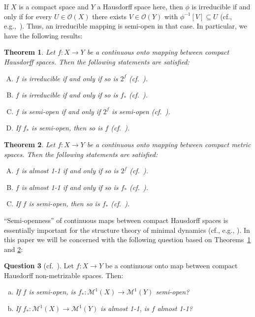 \documentclass[12pt,final,3p,times]{elsarticle}
\newtheorem{sthm}{Theorem}[subsection]
\theoremstyle{definition}
\newtheorem{sq}[sthm]{Question}
\numberwithin{equation}{section}
\begin{document}
If $X$ is a compact space and $Y$ a Hausdorff space here, then $\phi$ is irreducible if and only if 
for every $U\in\mathscr{O}(X)$ there exists $V\in\mathscr{O}(Y)$ with $\phi^{-1}[V]\subseteq U$ (cf., e.g.,~\cite{DeV}). Thus, an irreducible mapping is semi-open in that case. In particular, we have the following results:

\begin{sthm}\label{1.2.2}
Let $f\colon X\rightarrow Y$ be a continuous onto mapping between compact Hausdorff spaces. Then the following statements are satisfied: 
\begin{enumerate}[A.]
\item $f$ is irreducible if and only if so is $2^f$ (cf.~\cite[Thm.~9B]{DX}).

\item $f$ is irreducible if and only if so is $f_*$ (cf.~\cite[Thm.~1.2-($\mathcal{M}_i$)]{CH}).

\item $f$ is semi-open if and only if $2^f$ is semi-open (cf.~\cite[Thm.~4]{DX}).

\item If $f_*$ is semi-open, then so is $f$ (cf.~\cite[Thm.~B$^{\prime\prime}$]{DX}).
\end{enumerate}
\end{sthm}

\begin{sthm}\label{1.2.3}
Let $f\colon X\rightarrow Y$ be a continuous onto mapping between compact metric spaces. Then the following statements are satisfied:
\begin{enumerate}[A.]
    \item $f$ is almost 1-1 if and only if so is $2^f$ (cf.~\cite[Thm.~1.1-($\mathcal{H}_a^m$)]{CH}).
    \item $f$ is almost 1-1 if and only if so is $f_*$ (cf.~\cite[Thm.~1.2-($\mathcal{M}_a^m$)]{CH}).
    \item If $f$ is semi-open, then so is $f_*$ (cf.~\cite[Thm.~2.3]{G07}).
\end{enumerate}
\end{sthm}

``Semi-openness'' of continuous maps between compact Hausdorff spaces is essentially important for the structure theory of minimal dynamics (cf., e.g., \cite{V70, B79, Wo, A88, DeV, Ak}). In this paper we will be concerned with the following question based on Theorems~\ref{1.2.2} and \ref{1.2.3}:

\begin{sq}[cf.~\cite{DX, CH}]\label{1.2.4}
Let $f\colon X\rightarrow Y$ be a continuous onto map between compact Hausdorff non-metrizable spaces. Then:
\begin{enumerate}[a.]
    \item[\textbf{a.}] {\it If $f$ is semi-open, is $f_*\colon\mathcal{M}^1(X)\rightarrow\mathcal{M}^1(Y)$ semi-open?}
    \item[\textbf{b.}] {\it If $f_*\colon\mathcal{M}^1(X)\rightarrow\mathcal{M}^1(Y)$ is almost 1-1, is $f$ almost 1-1?}
\end{enumerate}
\end{sq}
\end{document}
